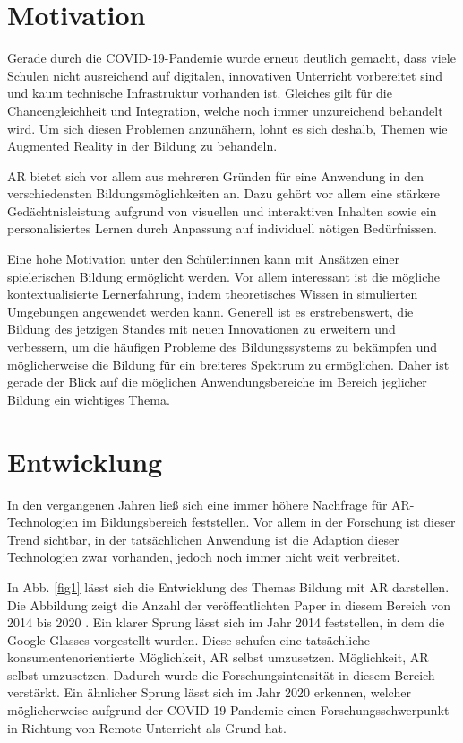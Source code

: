 \documentclass[conference]{IEEEtran}
\begin{document}
\section{Motivation}
Gerade durch die COVID-19-Pandemie wurde erneut deutlich gemacht, dass viele Schulen nicht ausreichend auf digitalen, innovativen Unterricht vorbereitet sind und kaum technische 
Infrastruktur vorhanden ist. Gleiches gilt für die Chancengleichheit und Integration, welche noch immer unzureichend behandelt wird. Um sich diesen Problemen anzunähern, lohnt es sich deshalb, Themen wie Augmented Reality in der Bildung zu behandeln.

AR bietet sich vor allem aus mehreren Gründen für eine Anwendung in den verschiedensten
Bildungsmöglichkeiten an. Dazu gehört vor allem eine stärkere Gedächtnisleistung aufgrund von
visuellen und interaktiven Inhalten sowie ein personalisiertes Lernen durch Anpassung 
auf individuell nötigen Bedürfnissen. \cite{b1} 

Eine hohe Motivation unter den Schüler:innen 
kann mit Ansätzen einer spielerischen Bildung ermöglicht werden. Vor allem interessant ist 
die mögliche kontextualisierte Lernerfahrung, indem theoretisches Wissen in simulierten 
Umgebungen angewendet werden kann. \cite{b2} 
Generell ist es erstrebenswert, die Bildung des jetzigen Standes mit neuen Innovationen zu erweitern und verbessern, 
um die häufigen Probleme des Bildungssystems zu bekämpfen und möglicherweise die Bildung für ein breiteres Spektrum zu 
ermöglichen. Daher ist gerade der Blick auf die möglichen Anwendungsbereiche im Bereich jeglicher Bildung ein wichtiges Thema.

\section{Entwicklung}
In den vergangenen Jahren ließ sich eine immer höhere Nachfrage für AR-Technologien im Bildungsbereich feststellen. Vor allem in der Forschung ist dieser Trend sichtbar, in der tatsächlichen Anwendung ist die
Adaption dieser Technologien zwar vorhanden, jedoch noch immer nicht weit verbreitet. \cite{b3}

In Abb. \ref{fig1} lässt sich die Entwicklung des Themas Bildung mit AR darstellen. Die Abbildung zeigt die Anzahl
der veröffentlichten Paper in diesem Bereich von 2014 bis 2020 \cite{b15}. Ein klarer Sprung lässt sich im Jahr 2014 feststellen,
in dem die Google Glasses vorgestellt wurden. Diese schufen eine tatsächliche konsumentenorientierte Möglichkeit, AR selbst umzusetzen. 
Möglichkeit, AR selbst umzusetzen. Dadurch wurde die Forschungsintensität in diesem Bereich verstärkt. 
Ein ähnlicher Sprung lässt sich im Jahr 2020 erkennen, welcher möglicherweise aufgrund der COVID-19-Pandemie einen Forschungsschwerpunkt in Richtung von Remote-Unterricht als Grund hat.
\end{document}
